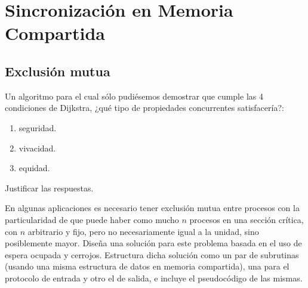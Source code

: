 \section{Sincronización en Memoria Compartida}
\subsection{Exclusión mutua}
\begin{ejercicio}
    Un algoritmo para el cual sólo pudiésemos demostrar que cumple las 4 condiciones de Dijkstra, ¿qué tipo de propiedades concurrentes satisfacería?: 
    \begin{enumerate}[label=(\alph*)]
        \item seguridad.
        \item vivacidad.
        \item equidad.
    \end{enumerate}
    Justificar las respuestas.
\end{ejercicio}

\begin{ejercicio}
    En algunas aplicaciones es necesario tener exclusión mutua entre procesos con la particularidad de que puede haber como mucho $n$ procesos en una sección crítica, con $n$ arbitrario y fijo, pero no necesariamente igual a la unidad, sino posiblemente mayor. Diseña una solución para este problema basada en el uso de espera ocupada y cerrojos. Estructura dicha solución como un par de subrutinas (usando una misma estructura de datos en memoria compartida), una para el protocolo de entrada y otro el de salida, e incluye el pseudocódigo de las mismas.
\end{ejercicio}

